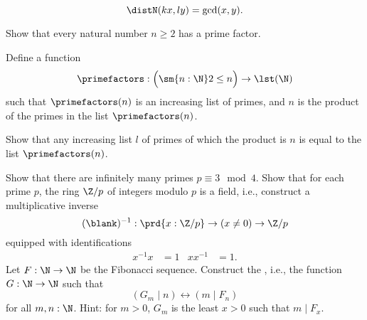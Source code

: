 \begin{exercises}
\begin{subexenum}
  \begin{equation*}
    \distN(kx,ly)=\gcd(x,y).
  \end{equation*}
  \end{subexenum}
  \exitem
  \begin{subexenum}
  \item Show that every natural number $n\geq 2$ has a prime factor.
  \item Define a function
    \begin{equation*}
      \primefactors : \Big(\sm{n:\N}2\leq n\Big)\to \lst(\N)
    \end{equation*}
    such that $\primefactors(n)$ is an increasing list of primes, and $n$ is the product of the primes in the list $\primefactors(n)$.
  \item Show that any increasing list $l$ of primes of which the product is $n$ is equal to the list $\primefactors(n)$.
  \end{subexenum}
  \exitem Show that there are infinitely many primes $p\equiv 3\mod 4$.
  \exitem Show that for each prime $p$, the ring $\Z/p$ of integers modulo $p$ is a field, i.e., construct a multiplicative inverse
  \begin{equation*}
    (\blank)^{-1} : \prd{x:\Z/p}\to (x\neq 0) \to \Z/p
  \end{equation*}
  equipped with identifications
  \begin{align*}
    x^{-1}x & = 1 & xx^{-1} & = 1.
  \end{align*}
  \exitem Let $F:\N\to\N$ be the Fibonacci sequence. Construct the , i.e., the function $G:\N\to\N$ such that
  \begin{equation*}
    (G_m\mid n) \leftrightarrow (m\mid F_n)
  \end{equation*}
  for all $m,n:\N$. Hint: for $m>0$, $G_m$ is the least $x>0$ such that $m\mid F_x$. 
\end{exercises}

